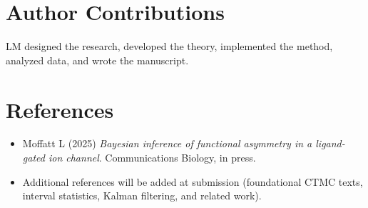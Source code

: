\documentclass[9pt]{elife}
\begin{document}
\section*{Author Contributions}
LM designed the research, developed the theory, implemented the method, analyzed data, and wrote the manuscript.

\section*{References}
\begin{itemize}
  \item Moffatt L (2025) \emph{Bayesian inference of functional asymmetry in a ligand-gated ion channel}. Communications Biology, in press.
  \item Additional references will be added at submission (foundational CTMC texts, interval statistics, Kalman filtering, and related work).
\end{itemize}
\end{document}
